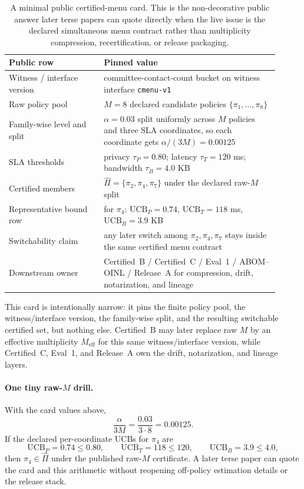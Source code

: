 \documentclass[11pt]{article}
\begin{document}
\begin{table}[t]
\centering
\small
\begin{tabular}{@{}p{0.32\linewidth}p{0.59\linewidth}@{}}
\toprule
\textbf{Public row} & \textbf{Pinned value}\\
\midrule
Witness / interface version & committee-contact-count bucket on witness interface \texttt{cmenu-v1} \\
Raw policy pool & $M=8$ declared candidate policies $\{\pi_1,\ldots,\pi_8\}$ \\
Family-wise level and split & $\alpha=0.03$ split uniformly across $M$ policies and three SLA coordinates, so each coordinate gets $\alpha/(3M)=0.00125$ \\
SLA thresholds & privacy $\tau_P=0.80$; latency $\tau_T=120$ ms; bandwidth $\tau_B=4.0$ KB \\
Certified members & $\widehat\Pi=\{\pi_2,\pi_4,\pi_7\}$ under the declared raw-$M$ split \\
Representative bound row & for $\pi_4$: $\mathrm{UCB}_P=0.74$, $\mathrm{UCB}_T=118$ ms, $\mathrm{UCB}_B=3.9$ KB \\
Switchability claim & any later switch among $\pi_2,\pi_4,\pi_7$ stays inside the same certified menu contract \\
Downstream owner & Certified~B / Certified~C / Eval~1 / ABOM--OINL / Release~A for compression, drift, notarization, and lineage \\
\bottomrule
\end{tabular}
\caption{A minimal public certified-menu card. This is the non-decorative public answer later terse papers can quote directly when the live issue is the declared simultaneous menu contract rather than multiplicity compression, recertification, or release packaging.}
\label{tab:minimal-certified-menu-card}
\end{table}

This card is intentionally narrow: it pins the finite policy pool, the witness/interface version, the family-wise split, and the resulting switchable certified set, but nothing else.
Certified~B may later replace raw $M$ by an effective multiplicity $M_{\mathrm{eff}}$ for this same witness/interface version, while Certified~C, Eval~1, and Release~A own the drift, notarization, and lineage layers.\cite{series:sigcomp,series:recert,series:eval1,series:releaseA}

\paragraph{One tiny raw-$M$ drill.}
With the card values above,
\[
\frac{\alpha}{3M}=\frac{0.03}{3\cdot 8}=0.00125.
\]
If the declared per-coordinate UCBs for $\pi_4$ are
\[
\mathrm{UCB}_P=0.74\le 0.80,\qquad \mathrm{UCB}_T=118\le 120,\qquad \mathrm{UCB}_B=3.9\le 4.0,
\]
then $\pi_4\in\widehat\Pi$ under the published raw-$M$ certificate.
A later terse paper can quote the card and this arithmetic without reopening off-policy estimation details or the release stack.
\end{document}
